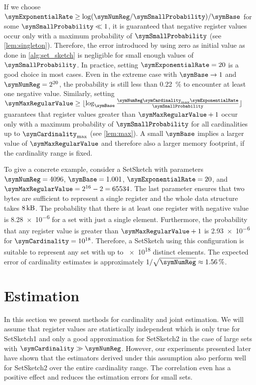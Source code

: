 \documentclass[sigconf, nonacm]{acmart}
\newif\ifextended\extendedtrue
\begin{document}
If we choose $\symExponentialRate \geq \log(\symNumReg/\symSmallProbability)/\symBase$ for some $\symSmallProbability\ll 1$, it is guaranteed that negative register values occur only with a maximum probability of $\symSmallProbability$ \ifextended(see \cref{lem:singleton})\else\cite{Ertl2021}\fi. Therefore, the error introduced by using zero as initial value as done in \cref{alg:set_sketch} is negligible for small enough values of $\symSmallProbability$. In practice, setting $\symExponentialRate=20$ is a good choice in most cases. Even in the extreme case with $\symBase\rightarrow 1$ and $\symNumReg=2^{20}$, the probability is still less than \SI{0.22}{\percent} to encounter at least one negative value.
Similarly, setting $\symMaxRegularValue \geq \lfloor \log_\symBase \frac{\symNumReg\symCardinality_\textnormal{max}\symExponentialRate}{\symSmallProbability}\rfloor$ guarantees that register values greater than $\symMaxRegularValue+1$ occur only with a maximum probability of $\symSmallProbability$ for all cardinalities up to $\symCardinality_\textnormal{max}$ \ifextended(see \cref{lem:max})\else\cite{Ertl2021}\fi.
A small $\symBase$ implies a larger value of $\symMaxRegularValue$ and therefore also a larger memory footprint, if the cardinality range is fixed.

To give a concrete example, consider a SetSketch with parameters $\symNumReg=4096$, $\symBase=1.001$, $\symExponentialRate = 20$, and $\symMaxRegularValue = 2^{16}-2 = 65534$. The last parameter ensures that two bytes are sufficient to represent a single register and the whole data structure takes  $\SI{8}{\kilo\byte}$. 
The probability that there is at least one register with negative value is \num{8.28e-6} for a set with just a single element. Furthermore, the probability that any register value is greater than $\symMaxRegularValue+1$ is \num{2.93e-6} for $\symCardinality=\num{e18}$. Therefore, a SetSketch using this configuration is suitable to represent any set with up to \num{e18} distinct elements. The expected error of cardinality estimates is approximately $1/\sqrt{\symNumReg}\approx\SI{1.56}{\percent}$.

\section{Estimation}
In this section we present methods for cardinality and joint estimation. We will assume that register values are statistically independent which is only true for SetSketch1 and only a good approximation for SetSketch2 in the case of large sets with $\symCardinality\gg\symNumReg$. However, our experiments presented later have shown that the estimators derived under this assumption also perform well for SetSketch2 over the entire cardinality range. The correlation even has a positive effect and reduces the estimation errors for small sets.
\end{document}
